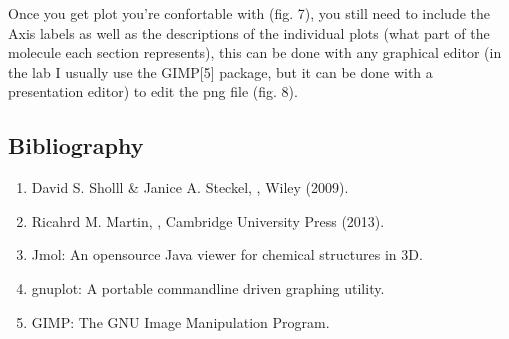 \documentclass[letterpaper,10pt,english,openany,oneside]{sphinxmanual}
\begin{document}
\sphinxAtStartPar
Once you get plot you’re confortable with (fig. 7), you still need to include the Axis labels as well as the descriptions of the individual plots (what part of the molecule each section represents), this can be done with any graphical editor (in the lab I usually use the GIMP{[}5{]} package, but it can be done with a presentation editor) to edit the png file (fig. 8).

\begin{figure}[htbp]
\centering

\noindent{}
\end{figure}

\begin{figure}[htbp]
\centering

\noindent{}
\end{figure}


\subsection{Bibliography}
\label{\detokenize{tutorials/ddos/density_of_states:bibliography}}\begin{enumerate}
%
\item {} 
\sphinxAtStartPar
David S. Sholll \&  Janice A. Steckel, , Wiley (2009).

\item {} 
\sphinxAtStartPar
Ricahrd M. Martin, , Cambridge University Press (2013).

\item {} 
\sphinxAtStartPar
Jmol: An open\sphinxhyphen{}source Java viewer for chemical structures in 3D. 

\item {} 
\sphinxAtStartPar
gnuplot: A portable command\sphinxhyphen{}line driven graphing utility. 

\item {} 
\sphinxAtStartPar
GIMP: The GNU Image Manipulation Program. 

\end{enumerate}
\end{document}
